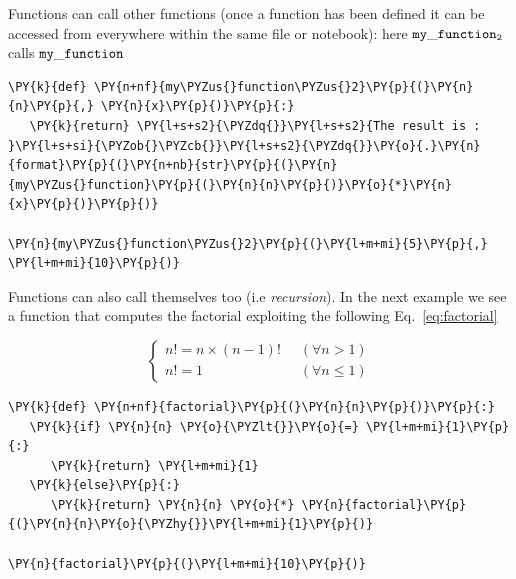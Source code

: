 \begin{Shaded}
\begin{Highlighting}[]
\end{Highlighting}
\end{Shaded}

Functions can call other functions (once a function has been defined it can be accessed 
from everywhere within the same file or notebook): here $\tt{my\_function_2}$ calls $\tt{my\_function}$

\begin{codebox}
\begin{Verbatim}[commandchars=\\\{\}]
\PY{k}{def} \PY{n+nf}{my\PYZus{}function\PYZus{}2}\PY{p}{(}\PY{n}{n}\PY{p}{,} \PY{n}{x}\PY{p}{)}\PY{p}{:} 
   \PY{k}{return} \PY{l+s+s2}{\PYZdq{}}\PY{l+s+s2}{The result is : }\PY{l+s+si}{\PYZob{}\PYZcb{}}\PY{l+s+s2}{\PYZdq{}}\PY{o}{.}\PY{n}{format}\PY{p}{(}\PY{n+nb}{str}\PY{p}{(}\PY{n}{my\PYZus{}function}\PY{p}{(}\PY{n}{n}\PY{p}{)}\PY{o}{*}\PY{n}{x}\PY{p}{)}\PY{p}{)}

\PY{n}{my\PYZus{}function\PYZus{}2}\PY{p}{(}\PY{l+m+mi}{5}\PY{p}{,} \PY{l+m+mi}{10}\PY{p}{)}
\end{Verbatim}
\end{codebox}

Functions can also call themselves too (i.e \emph{recursion}). In the next example we see a function 
that computes the factorial exploiting the following Eq.~\ref{eq:factorial}

\begin{equation}
\begin{cases}
    n! = n \times (n-1)! & \;\; (\forall n \gt 1) \\
    n! = 1 & \;\; (\forall n \le 1)
\end{cases}
\label{eq:factorial}
\end{equation}

\begin{codebox}
\begin{Verbatim}[commandchars=\\\{\}]
\PY{k}{def} \PY{n+nf}{factorial}\PY{p}{(}\PY{n}{n}\PY{p}{)}\PY{p}{:}
   \PY{k}{if} \PY{n}{n} \PY{o}{\PYZlt{}}\PY{o}{=} \PY{l+m+mi}{1}\PY{p}{:}
      \PY{k}{return} \PY{l+m+mi}{1}
   \PY{k}{else}\PY{p}{:}
      \PY{k}{return} \PY{n}{n} \PY{o}{*} \PY{n}{factorial}\PY{p}{(}\PY{n}{n}\PY{o}{\PYZhy{}}\PY{l+m+mi}{1}\PY{p}{)}

\PY{n}{factorial}\PY{p}{(}\PY{l+m+mi}{10}\PY{p}{)}
\end{Verbatim}
\end{codebox}

